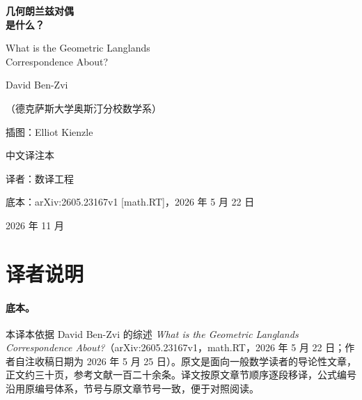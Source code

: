 \documentclass[11pt,a4paper,fontset=windows,UTF8]{ctexart}
\begin{document}
\begin{titlepage}
\centering
\vspace*{2.2cm}
{\Huge\bfseries 几何朗兰兹对偶\\[6pt]是什么？\par}
\vspace{0.8cm}
{\Large What is the Geometric Langlands\\[4pt]Correspondence About?\par}
\vspace{1.6cm}
{\large David Ben-Zvi\par}
\vspace{0.2cm}
{\normalsize（德克萨斯大学奥斯汀分校数学系）\par}
\vspace{1.2cm}
{\large 插图：Elliot Kienzle\par}
\vspace{1.6cm}
{\large 中文译注本\par}
\vspace{0.3cm}
{\normalsize 译者：数译工程\par}
\vspace{0.3cm}
{\normalsize 底本：arXiv:2605.23167v1 [math.RT]，2026 年 5 月 22 日\par}
\vfill
{\small 2026 年 11 月\par}
\end{titlepage}

\section*{译者说明}

\paragraph{底本。}本译本依据 David Ben-Zvi 的综述 \emph{What is the Geometric Langlands Correspondence About?}（arXiv:2605.23167v1，math.RT，2026 年 5 月 22 日；作者自注收稿日期为 2026 年 5 月 25 日）。原文是面向一般数学读者的导论性文章，正文约三十页，参考文献一百二十余条。译文按原文章节顺序逐段移译，公式编号沿用原编号体系，节号与原文章节号一致，便于对照阅读。
\end{document}
